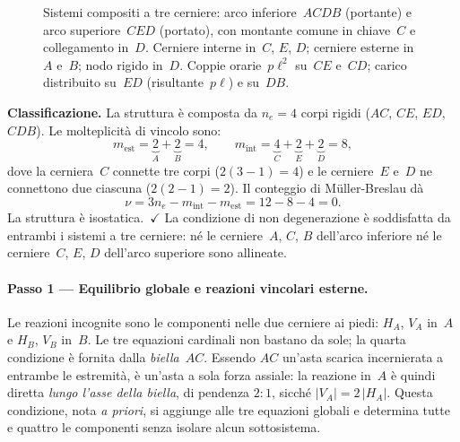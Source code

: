 \begin{figure}[htbp]
	\caption{Sistemi compositi a tre cerniere: arco inferiore~$ACDB$
		(portante) e arco superiore~$CED$ (portato), con montante
		comune in chiave~$C$ e collegamento in~$D$. Cerniere interne
		in~$C$, $E$, $D$; cerniere esterne in~$A$ e~$B$; nodo rigido
		in~$D$. Coppie orarie~$p\ell^2$ su~$CE$ e~$CD$; carico
		distribuito su~$ED$ (risultante~$p\ell$) e su~$DB$.}
	\label{fig:composito3c_schema}
\end{figure}


\noindent\textbf{Classificazione.}
La struttura è composta da $n_e = 4$ corpi rigidi
($AC$, $CE$, $ED$, $CDB$). Le molteplicità di vincolo sono:
\[
m_{\mathrm{est}} = \underbrace{2}_{A} + \underbrace{2}_{B} = 4,
\qquad
m_{\mathrm{int}} = \underbrace{4}_{C} + \underbrace{2}_{E}
+ \underbrace{2}_{D} = 8,
\]
dove la cerniera~$C$ connette tre corpi ($2(3-1)=4$) e le
cerniere~$E$ e~$D$ ne connettono due ciascuna ($2(2-1)=2$).
Il conteggio di Müller-Breslau dà
\[
\nu = 3n_e - m_{\mathrm{int}} - m_{\mathrm{est}}
= 12 - 8 - 4 = 0.
\]
La struttura è isostatica.~$\checkmark$
La condizione di non degenerazione è soddisfatta da entrambi
i sistemi a tre cerniere: né le cerniere~$A$, $C$, $B$
dell'arco inferiore né le cerniere~$C$, $E$, $D$ dell'arco
superiore sono allineate.

\paragraph{Passo 1 --- Equilibrio globale e
	reazioni vincolari esterne.}

Le reazioni incognite sono le componenti nelle due
cerniere ai piedi: $H_A$, $V_A$ in~$A$ e $H_B$, $V_B$
in~$B$. Le tre equazioni cardinali non bastano da sole;
la quarta condizione è fornita dalla \emph{biella}~$AC$.
Essendo $AC$ un'asta scarica incernierata a entrambe le
estremità, è un'asta a sola forza assiale: la reazione
in~$A$ è quindi diretta \emph{lungo l'asse della biella},
di pendenza $2{:}1$, sicché $|V_A| = 2\,|H_A|$. Questa
condizione, nota \emph{a priori}, si aggiunge alle tre
equazioni globali e determina tutte e quattro le componenti
senza isolare alcun sottosistema.

